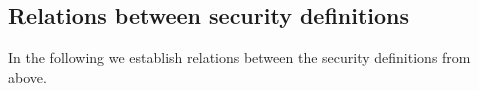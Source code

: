 
\subsection{Relations between security definitions}
In the following we  establish relations between 
the security definitions from above.


